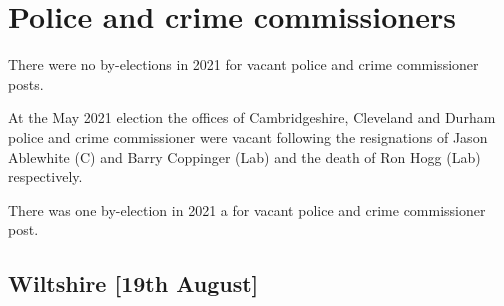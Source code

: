 \documentclass[a4paper,openany]{book}
\begin{document}
%
%

\section{Police and crime commissioners}

There were no by-elections in 2021 for vacant police and crime commissioner posts.

At the May 2021 election the offices of Cambridgeshire, Cleveland and Durham police and crime commissioner were vacant following the resignations of Jason Ablewhite (C) and Barry Coppinger (Lab) and the death of Ron Hogg (Lab) respectively.

There was one by-election in 2021 a for vacant police and crime commissioner post.

\subsection*{Wiltshire \hspace*{\fill}\nolinebreak[1]%
	\enspace\hspace*{\fill}
	[19th August]}
\end{document}
